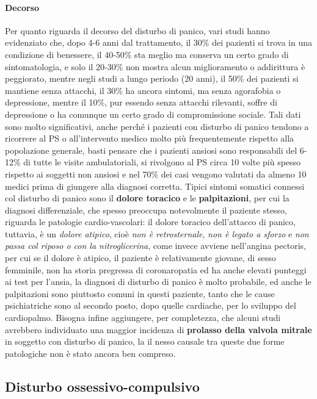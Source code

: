 \paragraph{Decorso}

Per quanto riguarda il decorso del disturbo di panico, vari studi hanno
evidenziato che, dopo 4-6 anni dal trattamento, il 30\% dei pazienti si
trova in una condizione di benessere, il 40-50\% sta meglio ma conserva
un certo grado di sintomatologia, e solo il 20-30\% non mostra alcun
miglioramento o addirittura è peggiorato, mentre negli studi a lungo
periodo (20 anni), il 50\% dei pazienti si mantiene senza attacchi, il
30\% ha ancora sintomi, ma senza agorafobia o depressione, mentre il
10\%, pur essendo senza attacchi rilevanti, soffre di depressione o ha
comunque un certo grado di compromissione sociale. Tali dati sono molto
significativi, anche perché i pazienti con disturbo di panico tendono a
ricorrere al PS o all'intervento medico molto più frequentemente
rispetto alla popolazione generale, basti pensare che i pazienti ansiosi
sono responsabili del 6-12\% di tutte le visite ambulatoriali, si
rivolgono al PS circa 10 volte più spesso rispetto ai soggetti non
ansiosi e nel 70\% dei casi vengono valutati da almeno 10 medici prima
di giungere alla diagnosi corretta. Tipici sintomi somatici connessi col
disturbo di panico sono il \textbf{dolore toracico} e le
\textbf{palpitazioni}, per cui la diagnosi differenziale, che spesso
preoccupa notevolmente il paziente stesso, riguarda le patologie
cardio-vascolari: il dolore toracico dell'attacco di panico, tuttavia, è
un \emph{dolore atipico}, cioè \emph{non è retrosternale}, \emph{non è
legato a sforzo} e \emph{non passa col riposo o con la nitroglicerina},
come invece avviene nell'angina pectoris, per cui se il dolore è
atipico, il paziente è relativamente giovane, di sesso femminile, non ha
storia pregressa di coronaropatia ed ha anche elevati punteggi ai test
per l'ansia, la diagnosi di disturbo di panico è molto probabile, ed
anche le palpitazioni sono piuttosto comuni in questi paziente, tanto
che le cause psichiatriche sono al secondo posto, dopo quelle cardiache,
per lo sviluppo del cardiopalmo. Bisogna infine aggiungere, per
completezza, che alcuni studi avrebbero individuato una maggior
incidenza di \textbf{prolasso della valvola mitrale} in soggetto con
disturbo di panico, la il nesso causale tra queste due forme patologiche
non è stato ancora ben compreso.

\subsection{Disturbo ossessivo-compulsivo}

